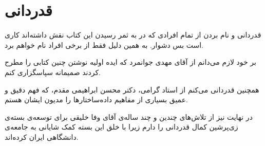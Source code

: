 \section*{قدردانی}
قدردانی و نام بردن از تمام افرادی که در به ثمر رسیدن این کتاب نقش داشته‌اند کاری است بس دشوار. به همین دلیل فقط از برخی افراد نام خواهم برد.

بر خود لازم می‌دانم از آقای مهدی جوانمرد که ایده‌ اولیه نوشتن چنین کتابی را مطرح کردند صمیمانه سپاسگزاری کنم.

همچنین قدردانی می‌کنم از استاد گرامی، دکتر محسن ابراهیمی مقدم، که فهم دقیق و عمیق بسیاری از مفاهیم داده‌ساختارها را مدیون ایشان هستم.

در نهایت نیز از تلاش‌‌های چندین و چند ساله‌ی آقای وفا خلیقی برای توسعه‌ی بسته‌ی زی‌پرشین کمال قدردانی را دارم زیرا با خلق این بسته کمک شایانی به جامعه‌ی دانشگاهی ایران کرده‌اند.